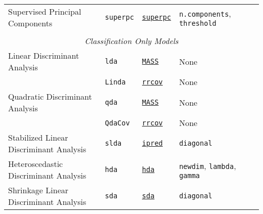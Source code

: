 \documentclass[12pt]{article}
\begin{document}
\begin{landscape}
\begin{longtable}{lllll}
      Supervised Principal Components&
         \texttt{superpc}  &
         {\tt \href{http://cran.r-project.org/web/packages/superpc/index.html}{superpc}} &
         \texttt{n.components}, \texttt{threshold}\\
            
\\             
\multicolumn{5}{c}{{{\em Classification Only Models}}} \\ 

\rowcolor[rgb]{.95, .95, .95}         
      Linear Discriminant Analysis &
         \texttt{lda} & 
             {\tt \href{http://cran.r-project.org/web/packages/MASS/index.html}{MASS}}       &          
            None\\
\rowcolor[rgb]{.95, .95, .95}                     
          &
         \texttt{Linda} & 
              {\tt \href{http://cran.r-project.org/web/packages/rrcov/index.html}{rrcov}}       &          
            None\\
                        
            
      Quadratic Discriminant Analysis &
         \texttt{qda} & 
             {\tt \href{http://cran.r-project.org/web/packages/MASS/index.html}{MASS}}         &          
            None\\  
      &   \texttt{QdaCov} & 
             {\tt \href{http://cran.r-project.org/web/packages/rrcov/index.html}{rrcov}}        &          
            None\\            
            
\rowcolor[rgb]{.95, .95, .95}                     
      Stabilized Linear Discriminant Analysis&
         \texttt{slda} & 
              {\tt \href{http://cran.r-project.org/web/packages/ipred/index.html}{ipred}}        &          
            \texttt{diagonal}\\  
      
      Heteroscedastic Discriminant Analysis&
         \texttt{hda} & 
              {\tt \href{http://cran.r-project.org/web/packages/hda/index.html}{hda}}      &          
            \texttt{newdim}, \texttt{lambda}, \texttt{gamma}\\  
            
\rowcolor[rgb]{.95, .95, .95}                     
      Shrinkage Linear Discriminant Analysis &
         \texttt{sda} & 
              {\tt \href{http://cran.r-project.org/web/packages/sda/index.html}{sda}}      &          
            \texttt{diagonal}\\  
      

\end{longtable}
\end{landscape}
\end{document}

